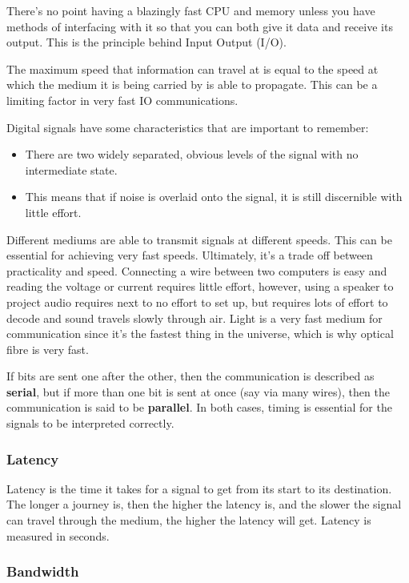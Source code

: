 There's no point having a blazingly fast CPU and memory unless you have methods
of interfacing with it so that you can both give it data and receive its
output. This is the principle behind Input Output (I/O).

The maximum speed that information can travel at is equal to the speed at which
the medium it is being carried by is able to propagate. This can be a limiting
factor in very fast IO communications.

Digital signals have some characteristics that are important to remember:

\begin{itemize}
	\item There are two widely separated, obvious levels of the signal with no
	intermediate state.
	\item This means that if noise is overlaid onto the signal, it is still
	discernible with little effort.
\end{itemize}

Different mediums are able to transmit signals at different speeds. This can be
essential for achieving very fast speeds. Ultimately, it's a trade off between
practicality and speed. Connecting a wire between two computers is easy and
reading the voltage or current requires little effort, however, using a speaker
to project audio requires next to no effort to set up, but requires lots of
effort to decode and sound travels slowly through air. Light is a very fast
medium for communication since it's the fastest thing in the universe, which is
why optical fibre is very fast.

If bits are sent one after the other, then the communication is described as
{\bf serial}, but if more than one bit is sent at once (say via many wires),
then the communication is said to be {\bf parallel}. In both cases, timing is
essential for the signals to be interpreted correctly.

\subsubsection{Latency}

Latency is the time it takes for a signal to get from its start to its
destination. The longer a journey is, then the higher the latency is, and the
slower the signal can travel through the medium, the higher the latency will
get. Latency is measured in seconds.

\subsubsection{Bandwidth}


